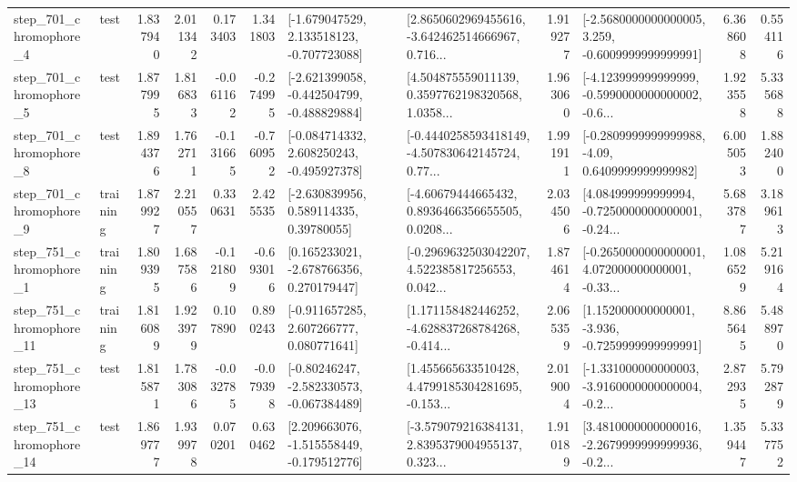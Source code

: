 \begin{tabular}{llrrrrllrlrr}
   step\_701\_chromophore\_4 &      test &      1.837940 &    2.011342 &      0.173403 &  1.341803 &   [-1.679047529, 2.133518123, -0.707723088] &  [2.8650602969455616, -3.642462514666967, 0.716... &       1.919277 &  [-2.5680000000000005, 3.259, -0.6009999999999991] &            6.368608 &          0.554116 \\
   step\_701\_chromophore\_5 &      test &      1.877995 &    1.816833 &     -0.061162 & -0.274995 &  [-2.621399058, -0.442504799, -0.488829884] &  [4.504875559011139, 0.3597762198320568, 1.0358... &       1.963060 &  [-4.123999999999999, -0.5990000000000002, -0.6... &            1.923558 &          5.335688 \\
   step\_701\_chromophore\_8 &      test &      1.894376 &    1.762711 &     -0.131665 & -0.760952 &   [-0.084714332, 2.608250243, -0.495927378] &  [-0.4440258593418149, -4.507830642145724, 0.77... &       1.991911 &   [-0.2809999999999988, -4.09, 0.6409999999999982] &            6.005053 &          1.882400 \\
   step\_701\_chromophore\_9 &  training &      1.879927 &    2.210557 &      0.330631 &  2.425535 &     [-2.630839956, 0.589114335, 0.39780055] &  [-4.60679444665432, 0.8936466356655505, 0.0208... &       2.034506 &  [4.084999999999994, -0.7250000000000001, -0.24... &            5.683787 &          3.189613 \\
   step\_751\_chromophore\_1 &  training &      1.809395 &    1.687586 &     -0.121809 & -0.693016 &    [0.165233021, -2.678766356, 0.270179447] &  [-0.2969632503042207, 4.522385817256553, 0.042... &       1.874614 &  [-0.2650000000000001, 4.072000000000001, -0.33... &            1.086529 &          5.219164 \\
  step\_751\_chromophore\_11 &  training &      1.816089 &    1.923979 &      0.107890 &  0.890243 &    [-0.911657285, 2.607266777, 0.080771641] &  [1.171158482446252, -4.628837268784268, -0.414... &       2.065359 &   [1.152000000000001, -3.936, -0.7259999999999991] &            8.865645 &          5.488970 \\
  step\_751\_chromophore\_13 &      test &      1.815871 &    1.783086 &     -0.032785 & -0.079398 &   [-0.80246247, -2.582330573, -0.067384489] &  [1.455665633510428, 4.4799185304281695, -0.153... &       2.019004 &  [-1.331000000000003, -3.9160000000000004, -0.2... &            2.872935 &          5.792879 \\
  step\_751\_chromophore\_14 &      test &      1.869777 &    1.939978 &      0.070201 &  0.630462 &   [2.209663076, -1.515558449, -0.179512776] &  [-3.579079216384131, 2.8395379004955137, 0.323... &       1.910189 &  [3.4810000000000016, -2.2679999999999936, -0.2... &            1.359447 &          5.337752 \\

\end{tabular}

